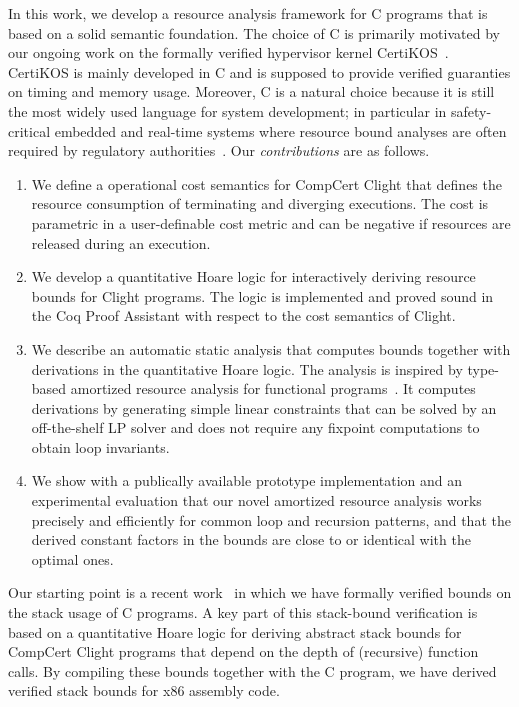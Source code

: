 \documentclass[nocopyrightspace,preprint]{sigplanconf}
\begin{document}
%
In this work, we develop a resource analysis framework for C programs
that is based on a solid semantic foundation.  The choice of C is
primarily motivated by our ongoing work on the formally verified
hypervisor kernel CertiKOS~\cite{GuVFSC11}.  CertiKOS is mainly
developed in C and is supposed to provide verified guaranties on
timing and memory usage.  Moreover, C is a natural choice because it
is still the most widely used language for system development; in
particular in safety-critical embedded and real-time systems where
resource bound analyses are often required by regulatory
authorities~\cite{May2013}.  Our \emph{contributions} are as follows.
%
\begin{enumerate}
\item We define a operational cost semantics for CompCert Clight that
  defines the resource consumption of terminating and diverging
  executions.  The cost is parametric in a user-definable cost metric
  and can be negative if resources are released during an execution.
\item We develop a quantitative Hoare logic for interactively deriving
  resource bounds for Clight programs.  The logic is implemented and
  proved sound in the Coq Proof Assistant with respect to the cost
  semantics of Clight.
\item We describe an automatic static analysis that computes bounds
  together with derivations in the quantitative Hoare logic.  The
  analysis is inspired by type-based amortized resource analysis for
  functional programs~\cite{Jost03,HoffmannAH12}.  It computes
  derivations by generating simple linear constraints that can be
  solved by an off-the-shelf LP solver and does not require any
  fixpoint computations to obtain loop invariants.
\item We show with a publically available prototype implementation and
  an experimental evaluation that our novel amortized resource
  analysis works precisely and efficiently for common loop and
  recursion patterns, and that the derived constant factors in the
  bounds are close to or identical with the optimal ones.
\end{enumerate}
%
Our starting point is a recent work~\cite{veristack14} in which we
have formally verified bounds on the stack usage of C programs.  A key
part of this stack-bound verification is based on a quantitative Hoare
logic for deriving abstract stack bounds for CompCert Clight programs
that depend on the depth of (recursive) function calls.  %
By compiling these bounds together with the C program, we have derived
verified stack bounds for x86 assembly code.
\end{document}
